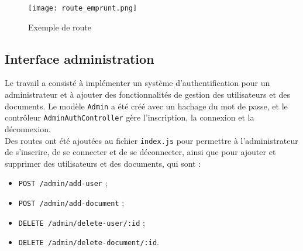\documentclass[12pt,a4paper]{article}
\begin{document}
\begin{figure}[!h]
	\begin{center}
		\texttt{[image: route\_emprunt.png]}
		\caption{Exemple de route}
	\end{center}
\end{figure}

\newpage




\subsection{Interface administration}

Le travail a consisté à implémenter un système d'authentification pour un administrateur et à ajouter des fonctionnalités de gestion des utilisateurs et des documents. Le modèle \texttt{Admin} a été créé avec un hachage du mot de passe, et le contrôleur \texttt{AdminAuthController} gère l'inscription, la connexion et la déconnexion.\\

Des routes ont été ajoutées au fichier \texttt{index.js} pour permettre à l'administrateur de s'inscrire, de se connecter et de se déconnecter, ainsi que pour ajouter  et supprimer des utilisateurs et des documents, qui sont : \\

\begin{itemize}
	\item \texttt{POST /admin/add-user} ;
	\item \texttt{POST /admin/add-document} ;
	\item \texttt{DELETE /admin/delete-user/:id} ;
	\item \texttt{DELETE /admin/delete-document/:id}. \\
\end{itemize}
\end{document}

